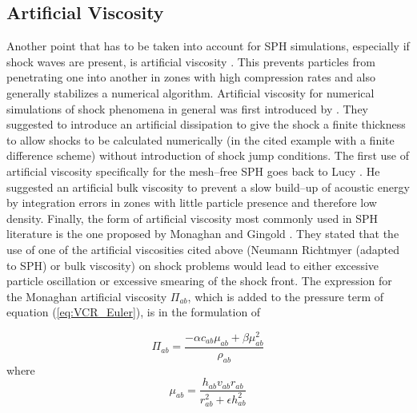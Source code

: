 \documentclass{report}
\begin{document}
\subsection{Artificial Viscosity}
\label{sec:ArtVisc}

Another point that has to be taken into account for SPH simulations, especially
if shock waves are present, is artificial viscosity \cite{Monaghan2005}. This
prevents particles from penetrating one into another in zones with high
compression rates and also generally stabilizes a numerical
algorithm.
Artificial viscosity for numerical simulations of shock phenomena
in general was first introduced by \cite{vonNeumann1950}. They suggested to
introduce an artificial dissipation to give the shock a finite thickness to 
allow shocks to be calculated numerically (in the cited example with a finite difference
scheme) without introduction of shock jump conditions.
The first use of artificial viscosity specifically for the mesh--free SPH goes
back to Lucy \cite{Lucy1977}. He suggested an artificial bulk viscosity to
prevent a slow build--up of acoustic energy by integration errors in zones with
little particle presence and therefore low density. 
Finally, the form of artificial viscosity most commonly used in SPH
literature \cite{Liu2003} is the one proposed by Monaghan and
Gingold \cite{Monaghan1983}. They stated that the use of one of the artificial
viscosities cited above (Neumann Richtmyer (adapted to SPH) or bulk
viscosity) on shock problems would lead to either excessive particle
oscillation or excessive smearing of the shock front. The expression for the Monaghan
artificial viscosity $\Pi_{ab}$, which is added to the pressure term of
equation (\ref{eq:VCR_Euler}), is in the formulation of \cite{Monaghan1992}

\begin{equation}
\label{eq:MonArtVis}
\Pi_{\mathit{ab}}= \frac{-\alpha c_{\mathit{ab}}\mu_{ab}+\beta \mu_{ab}^2}{\rho_{ab}}
\end{equation}
where 
\begin{equation}
\label{eq:FactArtVis}
\mu_{ab}=\frac{h_{ab}v_{ab}r_{ab}}{r_{ab}^2+\epsilon h_{ab}^2}
\end{equation}
\end{document}
